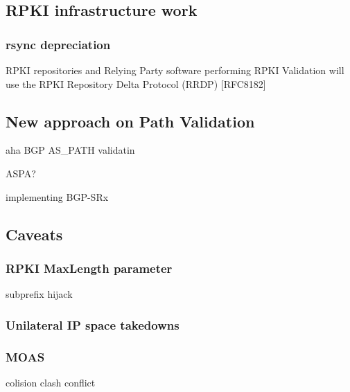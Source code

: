 
\subsection{RPKI infrastructure work}
\label{now:future}


\subsubsection{rsync depreciation}
RPKI repositories and Relying Party software performing RPKI Validation will use the RPKI Repository Delta Protocol (RRDP) [RFC8182]
\cite{ietf-sidrops-deprecate-rsync-00}
\subsubsection{}

\subsection{New approach on Path Validation}
\label{now:future:path}
aha BGP AS\_PATH validatin


ASPA? \cite{ietf-sidrops-aspa-profile-04} \cite{ietf-sidrops-aspa-verification-06}


\cite{Borchert2016} implementing BGP-SRx

\cite{Junjie2020}



\subsection{Caveats}
\label{now:caveats}
\subsubsection{RPKI MaxLength parameter}
subprefix hijack
\cite{ietf-sidrops-rpkimaxlen-05}

\subsubsection{Unilateral IP space takedowns}

\cite{Shrishak2020}

\subsubsection{MOAS}
colision clash conflict
\cite{Zhao2001}

